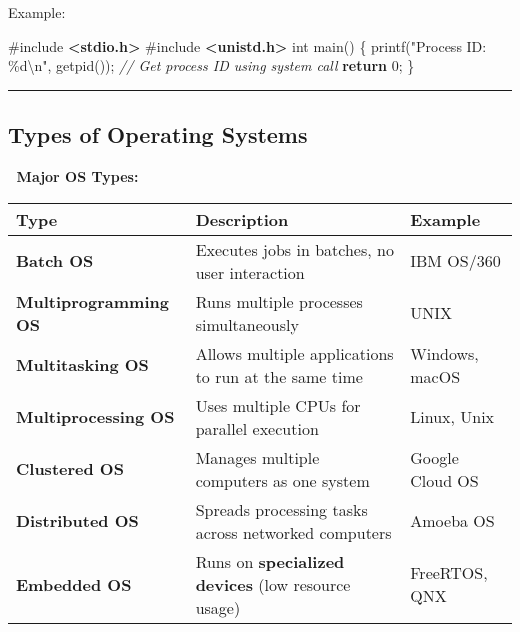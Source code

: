 \documentclass[
]{article}
\newenvironment{Shaded}{}{}
\newcommand{\CommentTok}[1]{\textcolor[rgb]{0.38,0.63,0.69}{\textit{#1}}}
\newcommand{\ControlFlowTok}[1]{\textcolor[rgb]{0.00,0.44,0.13}{\textbf{#1}}}
\newcommand{\DataTypeTok}[1]{\textcolor[rgb]{0.56,0.13,0.00}{#1}}
\newcommand{\DecValTok}[1]{\textcolor[rgb]{0.25,0.63,0.44}{#1}}
\newcommand{\ImportTok}[1]{\textcolor[rgb]{0.00,0.50,0.00}{\textbf{#1}}}
\newcommand{\NormalTok}[1]{#1}
\newcommand{\OperatorTok}[1]{\textcolor[rgb]{0.40,0.40,0.40}{#1}}
\newcommand{\PreprocessorTok}[1]{\textcolor[rgb]{0.74,0.48,0.00}{#1}}
\newcommand{\SpecialCharTok}[1]{\textcolor[rgb]{0.25,0.44,0.63}{#1}}
\newcommand{\StringTok}[1]{\textcolor[rgb]{0.25,0.44,0.63}{#1}}
\begin{document}
Example:

\begin{Shaded}
\begin{Highlighting}[]
\PreprocessorTok{\#include }\ImportTok{\textless{}stdio.h\textgreater{}}
\PreprocessorTok{\#include }\ImportTok{\textless{}unistd.h\textgreater{}}
\DataTypeTok{int}\NormalTok{ main}\OperatorTok{()} \OperatorTok{\{}
\NormalTok{    printf}\OperatorTok{(}\StringTok{"Process ID: }\SpecialCharTok{\%d\textbackslash{}n}\StringTok{"}\OperatorTok{,}\NormalTok{ getpid}\OperatorTok{());}  \CommentTok{// Get process ID using system call}
    \ControlFlowTok{return} \DecValTok{0}\OperatorTok{;}
\OperatorTok{\}}
\end{Highlighting}
\end{Shaded}

\begin{center}\rule{0.5\linewidth}{0.5pt}\end{center}

\subsection{\texorpdfstring{\textbf{Types of Operating
Systems}}{Types of Operating Systems}}\label{types-of-operating-systems}

📌 \textbf{Major OS Types:}

\begin{longtable}[]{@{}
  >{\raggedright\arraybackslash}p{}
  >{\raggedright\arraybackslash}p{}
  >{\raggedright\arraybackslash}p{}@{}}
\toprule\noalign{}
\begin{minipage}[b]{\linewidth}\raggedright
\textbf{Type}
\end{minipage} & \begin{minipage}[b]{\linewidth}\raggedright
\textbf{Description}
\end{minipage} & \begin{minipage}[b]{\linewidth}\raggedright
\textbf{Example}
\end{minipage} \\
\midrule\noalign{}
\endhead
\bottomrule\noalign{}
\endlastfoot
\textbf{Batch OS} & Executes jobs in batches, no user interaction & IBM
OS/360 \\
\textbf{Multiprogramming OS} & Runs multiple processes simultaneously &
UNIX \\
\textbf{Multitasking OS} & Allows multiple applications to run at the
same time & Windows, macOS \\
\textbf{Multiprocessing OS} & Uses multiple CPUs for parallel execution
& Linux, Unix \\
\textbf{Clustered OS} & Manages multiple computers as one system &
Google Cloud OS \\
\textbf{Distributed OS} & Spreads processing tasks across networked
computers & Amoeba OS \\
\textbf{Embedded OS} & Runs on \textbf{specialized devices} (low
resource usage) & FreeRTOS, QNX \\
\end{longtable}
\end{document}
